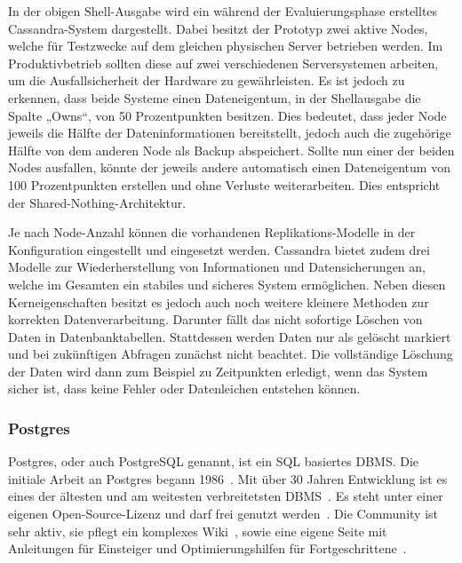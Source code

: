 In der obigen Shell-Ausgabe wird ein während der Evaluierungsphase erstelltes
Cassandra-System dargestellt. Dabei besitzt der Prototyp zwei aktive Nodes,
welche für Testzwecke auf dem gleichen physischen Server betrieben werden. Im
Produktivbetrieb sollten diese auf zwei verschiedenen Serversystemen arbeiten,
um die Ausfallsicherheit der Hardware zu gewährleisten. Es ist jedoch zu
erkennen, dass beide Systeme einen Dateneigentum, in der Shellausgabe die
Spalte „Owns“, von 50 Prozentpunkten besitzen. Dies bedeutet, dass jeder Node
jeweils die Hälfte der Dateninformationen bereitstellt, jedoch auch die
zugehörige Hälfte von dem anderen Node als Backup abspeichert. Sollte nun einer
der beiden Nodes ausfallen, könnte der jeweils andere automatisch einen
Dateneigentum von 100 Prozentpunkten erstellen und ohne Verluste
weiterarbeiten. Dies entspricht der \gls{Shared-Nothing-Architektur}.

Je nach Node-Anzahl können die vorhandenen Replikations-Modelle in der
Konfiguration eingestellt und eingesetzt werden. Cassandra bietet zudem drei
Modelle zur Wiederherstellung von Informationen und Datensicherungen an, welche
im Gesamten ein stabiles und sicheres System ermöglichen. Neben diesen
Kerneigenschaften besitzt es jedoch auch noch weitere kleinere Methoden
zur korrekten Datenverarbeitung. Darunter fällt das nicht sofortige Löschen von
Daten in Datenbanktabellen. Stattdessen werden Daten nur als gelöscht markiert
und bei zukünftigen Abfragen zunächst nicht beachtet. Die vollständige Löschung
der Daten wird dann zum Beispiel zu Zeitpunkten erledigt, wenn das System
sicher ist, dass keine Fehler oder Datenleichen entstehen können.
\nl%

\subsubsection{Postgres}
\label{subsubsec:postgres}
Postgres, oder auch PostgreSQL genannt, ist ein \gls{SQL} basiertes \gls{DBMS}.
Die initiale Arbeit an Postgres begann 1986~\cite{old_postgres}. Mit über 30
Jahren Entwicklung ist es eines der ältesten und am weitesten verbreitetsten
DBMS~\cite{db_ranking}. Es steht unter einer eigenen Open-Source-Lizenz und
darf frei genutzt werden~\cite{postgres_license}. Die Community ist sehr aktiv,
sie pflegt ein komplexes Wiki~\cite{postgres_wiki}, sowie eine eigene Seite mit
Anleitungen für Einsteiger und Optimierungshilfen für
Fortgeschrittene~\cite{postgres_tutorial}.



